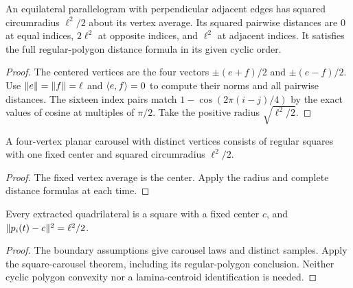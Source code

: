 \begin{lemma}
\label{lem:square-metric}
\leanok
{}
An equilateral parallelogram with perpendicular adjacent edges has
squared circumradius $\ell^2/2$ about its vertex average. Its squared
pairwise distances are $0$ at equal indices, $2\ell^2$ at opposite
indices, and $\ell^2$ at adjacent indices. It satisfies the full
regular-polygon distance formula in its given cyclic order.
\end{lemma}
\begin{proof}
\leanok
The centered vertices are the four vectors $\pm(e+f)/2$ and $\pm(e-f)/2$.
Use $\lVert e\rVert=\lVert f\rVert=\ell$ and $\langle e,f\rangle=0$ to compute their norms and
all pairwise distances. The sixteen index pairs match
$1-\cos(2\pi(i-j)/4)$ by the exact values of cosine at multiples of
$\pi/2$. Take the positive radius $\sqrt{\ell^2/2}$.
\end{proof}

\begin{proposition}
\label{prop:square-carousel}
\leanok
{}
A four-vertex planar carousel with distinct vertices consists of regular
squares with one fixed center and squared circumradius $\ell^2/2$.
\end{proposition}
\begin{proof}
\leanok
The fixed vertex average is the center. Apply the radius and complete
distance formulas at each time.
\end{proof}

\begin{proposition}
\label{prop:square}
\leanok
{}
Every extracted quadrilateral is a square with a fixed center $c$, and
$\lVert p_i(t)-c\rVert^2=\ell^2/2$.
\end{proposition}
\begin{proof}
\leanok
The boundary assumptions give carousel laws and distinct samples.
Apply the square-carousel theorem, including its regular-polygon conclusion.
Neither cyclic polygon convexity nor a lamina-centroid identification is needed.
\end{proof}

